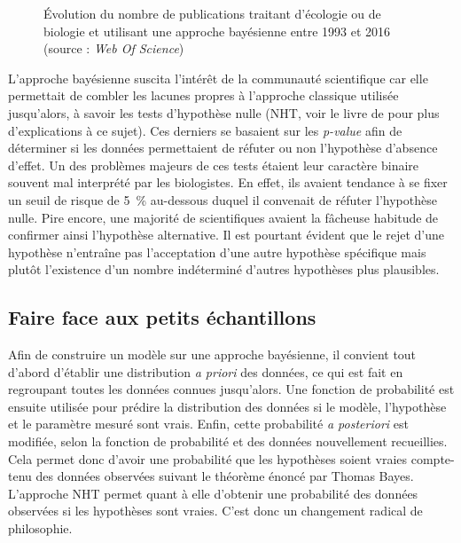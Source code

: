 \documentclass[11pt,twocolumn,twoside]{bopHomework}
\begin{document}
\begin{figure}[h]
  \centering{\graphfont}
  \caption{Évolution du nombre de publications traitant d'écologie ou de
    biologie et utilisant une approche bayésienne entre 1993 et 2016 (source :
    \textit{Web Of Science})}
  \label{fig:bibliometry}
\end{figure}

L'approche bayésienne suscita l'intérêt de la communauté scientifique car elle
permettait de combler les lacunes propres à l'approche classique utilisée
jusqu'alors, à savoir les tests d'hypothèse nulle (NHT, voir le livre de
\citet{fisher1925} pour plus d'explications à ce sujet).
Ces derniers se basaient sur les \textit{p-value} afin de déterminer si les
données permettaient de réfuter ou non l'hypothèse d'absence d'effet.
Un des problèmes majeurs de ces tests étaient leur caractère binaire souvent mal
interprété par les biologistes.
En effet, ils avaient tendance à se fixer un seuil de risque de 5~\% au-dessous
duquel il convenait de réfuter l'hypothèse nulle.
Pire encore, une majorité de scientifiques avaient la fâcheuse habitude de
confirmer ainsi l'hypothèse alternative.
Il est pourtant évident que le rejet d'une hypothèse n'entraîne pas
l'acceptation d'une autre hypothèse spécifique mais plutôt l'existence d'un
nombre indéterminé d'autres hypothèses plus plausibles.

\subsection{Faire face aux petits échantillons}

Afin de construire un modèle sur une approche bayésienne, il convient tout
d'abord d'établir une distribution \textit{a priori} des données, ce qui est
fait en regroupant toutes les données connues jusqu'alors.
Une fonction de probabilité est ensuite utilisée pour prédire la distribution
des données si le modèle, l'hypothèse et le paramètre mesuré sont vrais.
Enfin, cette probabilité \textit{a posteriori} est modifiée, selon la fonction
de probabilité et des données nouvellement recueillies.
Cela permet donc d'avoir une probabilité que les hypothèses soient vraies
compte-tenu des données observées suivant le théorème énoncé par Thomas Bayes.
L'approche NHT permet quant à elle d'obtenir une probabilité des données
observées si les hypothèses sont vraies.
C'est donc un changement radical de philosophie.
\end{document}
